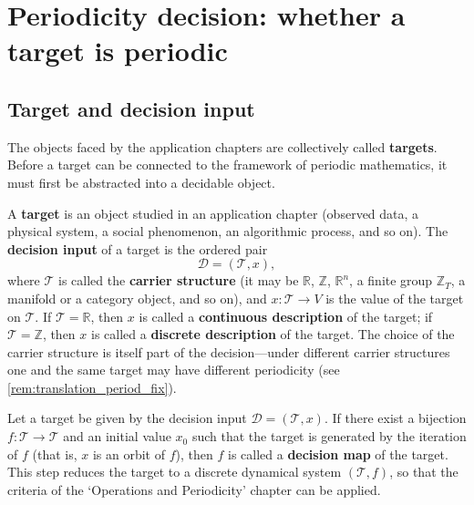 \section{Periodicity decision: whether a target is periodic}\label{sec:ps_periodicity_decision}

\subsection{Target and decision input}

The objects faced by the application chapters are collectively called \textbf{targets}. Before a target can be connected to the framework of periodic mathematics, it must first be abstracted into a decidable object.

\begin{definition}\label{def:ps_target}
A \textbf{target} is an object studied in an application chapter (observed data, a physical system, a social phenomenon, an algorithmic process, and so on). The \textbf{decision input} of a target is the ordered pair
\[
\mathcal{D}=(\mathcal{T},x),
\]
where $\mathcal{T}$ is called the \textbf{carrier structure} (it may be $\mathbb{R}$, $\mathbb{Z}$, $\mathbb{R}^n$, a finite group $\mathbb{Z}_T$, a manifold or a category object, and so on), and $x:\mathcal{T}\to V$ is the value of the target on $\mathcal{T}$. If $\mathcal{T}=\mathbb{R}$, then $x$ is called a \textbf{continuous description} of the target; if $\mathcal{T}=\mathbb{Z}$, then $x$ is called a \textbf{discrete description} of the target. The choice of the carrier structure is itself part of the decision---under different carrier structures one and the same target may have different periodicity (see \cref{rem:translation_period_fix}).
\end{definition}

\begin{definition}\label{def:ps_periodization}
Let a target be given by the decision input $\mathcal{D}=(\mathcal{T},x)$. If there exist a bijection $f:\mathcal{T}\to\mathcal{T}$ and an initial value $x_0$ such that the target is generated by the iteration of $f$ (that is, $x$ is an orbit of $f$), then $f$ is called a \textbf{decision map} of the target. This step reduces the target to a discrete dynamical system $(\mathcal{T},f)$, so that the criteria of the `Operations and Periodicity' chapter can be applied.
\end{definition}

